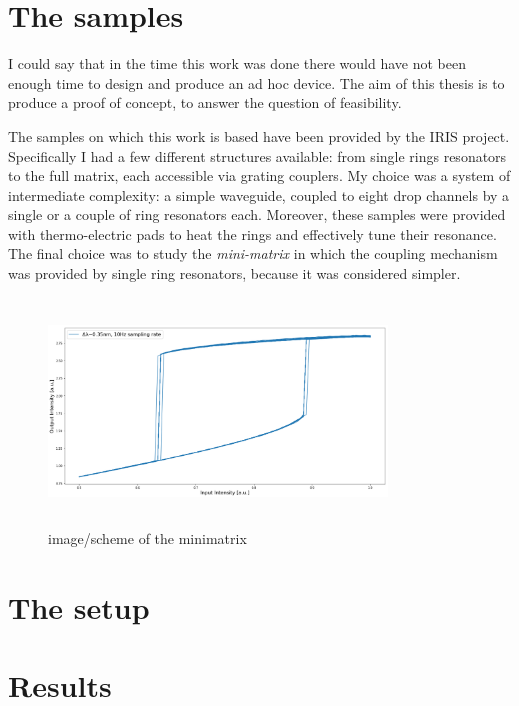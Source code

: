 \section{The samples}
I could say that in the time this work was done there would have not been enough time to design and produce an ad hoc device. The aim of this thesis is to produce a proof of concept, to answer the question of feasibility.
\vspace{1em}

The samples on which this work is based have been provided by the IRIS project.
Specifically I had a few different structures available: from single rings resonators to the full matrix, each accessible via grating couplers.
My choice was a system of intermediate complexity: a simple waveguide, coupled to eight drop channels by a single or a couple of ring resonators each.
Moreover, these samples were provided with thermo-electric pads to heat the rings and effectively tune their resonance.
The final choice was to study the \textit{mini-matrix} in which the coupling mechanism was provided by single ring resonators, because it was considered simpler.

\begin{figure}[ht]
	\centering
	\includegraphics[draft,width=9cm,height=6cm]{figures/foo.png}
	\caption{image/scheme of the minimatrix}
	\label{fig:minimatrix_full}
\end{figure}

\section{The setup}

\section{Results}